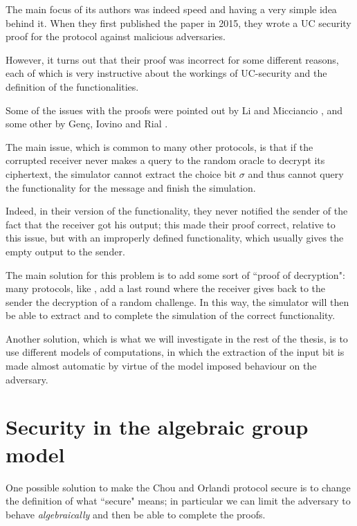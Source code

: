 The main focus of its authors was indeed speed and having a very simple idea behind it. When they first published the paper in 2015, they wrote a UC security proof for the protocol against malicious adversaries.

However, it turns out that their proof was incorrect for some different reasons, each of which is very instructive about the workings of UC-security and the definition of the functionalities.

Some of the issues with the proofs were pointed out by Li and Micciancio \cite{CO_Li_Micciancio}, and some other by Genç, Iovino and Rial \cite{CO_GIR}.

The main issue, which is common to many other protocols, is that if the corrupted receiver never makes a query to the random oracle to decrypt its ciphertext, the simulator cannot extract the choice bit $\sigma$ and thus cannot query the functionality for the message and finish the simulation.

Indeed, in their version of the functionality, they never notified the sender of the fact that the receiver got his output; this made their proof correct, relative to this issue, but with an improperly defined functionality, which usually gives the empty output to the sender.


The main solution for this problem is to add some sort of ``proof of decryption": many protocols, like \cite{BDD}, add a last round where the receiver gives back to the sender the decryption of a random challenge. In this way, the simulator will then be able to extract and to complete the simulation of the correct functionality.

Another solution, which is what we will investigate in the rest of the thesis, is to use different models of computations, in which the extraction of the input bit is made almost automatic by virtue of the model imposed behaviour on the adversary.

\section{Security in the algebraic group model}
One possible solution to make the Chou and Orlandi protocol secure is to change the definition of what ``secure" means; in particular we can limit the adversary to behave \emph{algebraically} and then be able to complete the proofs.

